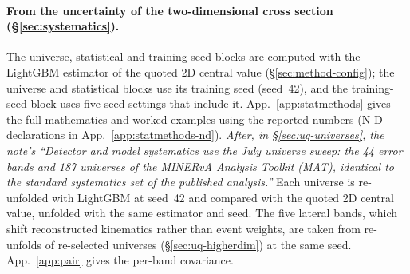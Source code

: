 \paragraph{From the uncertainty of the two-dimensional cross section (\S\ref{sec:systematics}).} The universe, statistical and training-seed blocks are computed with the LightGBM estimator of the quoted 2D central value (\S\ref{sec:method-config}); the universe and statistical blocks use its training seed (seed~42), and the training-seed block uses five seed settings that include it. App.~\ref{app:statmethods} gives the full mathematics and worked examples using the reported numbers (N-D declarations in App.~\ref{app:statmethods-nd}). \emph{After, in \S\ref{sec:uq-universes}, the note's ``Detector and model systematics use the July universe sweep: the 44 error bands and 187 universes of the MINERvA Analysis Toolkit (MAT), identical to the standard systematics set of the published analysis.''} Each universe is re-unfolded with LightGBM at seed~42 and compared with the quoted 2D central value, unfolded with the same estimator and seed. The five lateral bands, which shift reconstructed kinematics rather than event weights, are taken from re-unfolds of re-selected universes (\S\ref{sec:uq-higherdim}) at the same seed. App.~\ref{app:pair} gives the per-band covariance.

